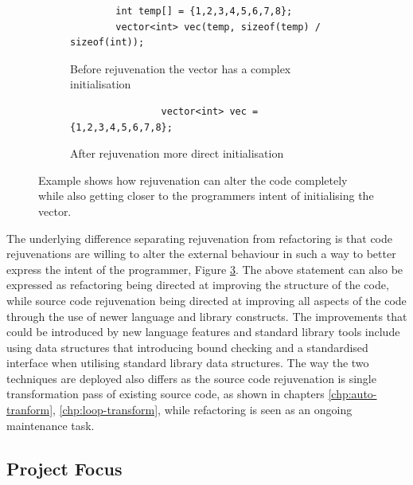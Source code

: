 \documentclass[bsc,frontabs,singlespacing,twoside,parskip,deptreport]{infthesis}
\begin{document}
\begin{figure}[H]
    
    \begin{subfigure}[h]{\textwidth}
        \begin{verbatim}
        int temp[] = {1,2,3,4,5,6,7,8};
        vector<int> vec(temp, sizeof(temp) / sizeof(int));
        \end{verbatim}
        \caption{Before rejuvenation the vector has a complex initialisation}
        \vspace{0.2cm}
        \label{fig:exp-intent-before}
    \end{subfigure}
    
    \begin{subfigure}[h]{\textwidth}
        \centering
        \begin{verbatim}
                vector<int> vec = {1,2,3,4,5,6,7,8};
        \end{verbatim}
        \caption{After rejuvenation more direct initialisation}
        \label{fig:exp-intent-after}
    \end{subfigure}

    \caption{Example shows how rejuvenation can alter the code completely while also getting closer to the programmers intent of initialising the vector.}
    \label{fig:exp-intent}
\end{figure}

The underlying difference separating rejuvenation from refactoring is that code rejuvenations are willing to alter the external behaviour in such a way to better express the intent of the programmer, Figure \ref{fig:exp-intent}. The above statement can also be expressed as refactoring being directed at improving the structure of the code, while source code rejuvenation being directed at improving all aspects of the code through the use of newer language and library constructs. The improvements that could be introduced by new language features and standard library tools include using data structures that introducing bound checking and a standardised interface when utilising standard library data structures. The way the two techniques are deployed also differs as the source code rejuvenation is single transformation pass of existing source code, as shown in chapters \ref{chp:auto-tranform}, \ref{chp:loop-transform}, while refactoring is seen as an ongoing maintenance task.

\subsection{Project Focus}
\end{document}
